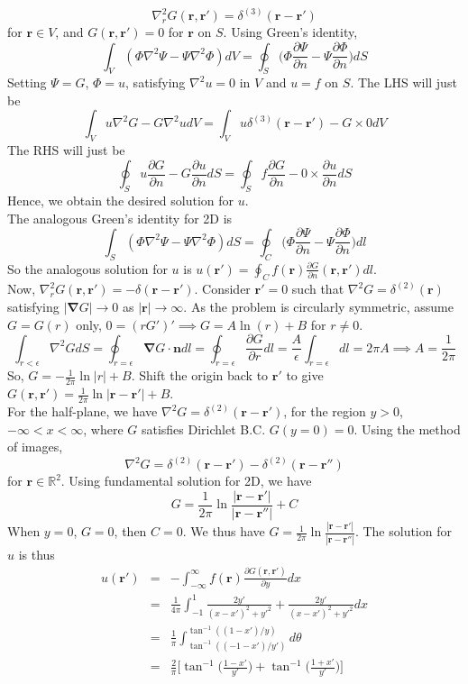 \documentclass[a4paper]{article}
\begin{document}
\begin{ans}
$$\nabla^2_rG(\mathbf{r},\mathbf{r'})=\delta^{(3)}(\mathbf{r}-\mathbf{r'})$$
for $\mathbf{r}\in V$, and $G(\mathbf{r},\mathbf{r'})=0$ for $\mathbf{r}$ on $S$. Using Green's identity,
$$\int_V(\Phi\nabla^2\Psi-\Psi\nabla^2\Phi)dV=\oint_S\bigg(\Phi\frac{\partial\Psi}{\partial n}-\Psi\frac{\partial\Phi}{\partial n}\bigg)dS$$
Setting $\Psi=G$, $\Phi=u$, satisfying $\nabla^2u=0$ in $V$ and $u=f$ on $S$. The LHS will just be
$$\int_Vu\nabla^2G-G\nabla^2udV=\int_Vu\delta^{(3)}(\mathbf{r}-\mathbf{r'})-G\times 0dV$$
The RHS will just be
$$\oint_Su\frac{\partial G}{\partial n}-G\frac{\partial u}{\partial n}dS=\oint_Sf\frac{\partial G}{\partial n}-0\times\frac{\partial u}{\partial n}dS$$
Hence, we obtain the desired solution for $u$.\\[5pt]
The analogous Green's identity for 2D is
$$\int_S(\Phi\nabla^2\Psi-\Psi\nabla^2\Phi)dS=\oint_C\bigg(\Phi\frac{\partial\Psi}{\partial n}-\Psi\frac{\partial\Phi}{\partial n}\bigg)dl$$
So the analogous solution for $u$ is $u(\mathbf{r'})=\oint_Cf(\mathbf{r})\frac{\partial G}{\partial n}(\mathbf{r},\mathbf{r'})dl$.\\[5pt]
Now, $\nabla_r^2G(\mathbf{r},\mathbf{r'})=-\delta(\mathbf{r}-\mathbf{r'})$. Consider $\mathbf{r'}=0$ such that $\nabla^2G=\delta^{(2)}(\mathbf{r})$ satisfying $|\boldsymbol{\nabla}G|\rightarrow0$ as $|\mathbf{r}|\rightarrow\infty$. As the problem is circularly symmetric, assume $G=G(r)$ only, $0=(rG')'\implies G=A\ln(r)+B$ for $r\neq 0$.
$$\int_{r<\epsilon}\nabla^2GdS=\oint_{r=\epsilon}\boldsymbol{\nabla}G\cdot\mathbf{n}dl=\oint_{r=\epsilon}\frac{\partial G}{\partial r}dl=\frac{A}{\epsilon}\int_{r=\epsilon}dl=2\pi A\implies A=\frac{1}{2\pi}$$
So, $G=-\frac{1}{2\pi}\ln|r|+B$. Shift the origin back to $\mathbf{r'}$ to give $G(\mathbf{r},\mathbf{r'})=\frac{1}{2\pi}\ln|\mathbf{r}-\mathbf{r'}|+B$.\\[5pt]
For the half-plane, we have $\nabla^2G=\delta^{(2)}(\mathbf{r}-\mathbf{r'})$, for the region $y>0$, $-\infty<x<\infty$, where $G$ satisfies Dirichlet B.C. $G(y=0)=0$. Using the method of images,
$$\nabla^2G=\delta^{(2)}(\mathbf{r}-\mathbf{r'})-\delta^{(2)}(\mathbf{r}-\mathbf{r''})$$
for $\mathbf{r}\in\mathbb{R}^2$. Using fundamental solution for 2D, we have
$$G=\frac{1}{2\pi}\ln\frac{|\mathbf{r}-\mathbf{r'}|}{|\mathbf{r}-\mathbf{r''}|}+C$$
When $y=0$, $G=0$, then $C=0$. We thus have $G=\frac{1}{2\pi}\ln\frac{|\mathbf{r}-\mathbf{r'}|}{|\mathbf{r}-\mathbf{r''}|}$. The solution for $u$ is thus
\begin{eqnarray}
u(\mathbf{r'})&=&-\int_{-\infty}^\infty f(\mathbf{r})\frac{\partial G(\mathbf{r},\mathbf{r'})}{\partial y}dx\nonumber\\&=&\frac{1}{4\pi}\int_{-1}^1\frac{2y'}{(x-x')^2+y'^2}+\frac{2y'}{(x-x')^2+y'^2}dx\nonumber\\&=&\frac{1}{\pi}\int_{\tan^{-1}((-1-x')/y')}^{\tan^{-1}((1-x')/y)}d\theta\nonumber\\&=&\frac{2}{\pi}\bigg[\tan^{-1}\bigg(\frac{1-x'}{y'}\bigg)+\tan^{-1}\bigg(\frac{1+x'}{y'}\bigg)\bigg]\nonumber
\end{eqnarray}
\end{ans}
\end{document}
